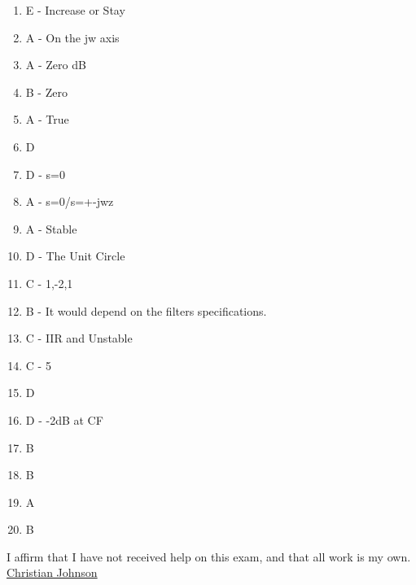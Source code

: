 \documentclass[11pt]{article}
\author{Christian}
\date{\today}
\title{}
\begin{document}
\begin{enumerate}
\item E - Increase or Stay
\item A - On the jw axis
\item A - Zero dB
\item B - Zero
\item A - True
\item D
\item D - s=0
\item A - s=0/s=+-jwz
\item A - Stable
\item D - The Unit Circle
\item C - 1,-2,1
\item B - It would depend on the filters specifications.
\item C - IIR and Unstable
\item C - 5
\item D
\item D - -2dB at CF
\item B
\item B
\item A
\item B
\end{enumerate}



I affirm that I have not received help on this exam, and that all work is my own.
\uline{Christian Johnson}
\end{document}
